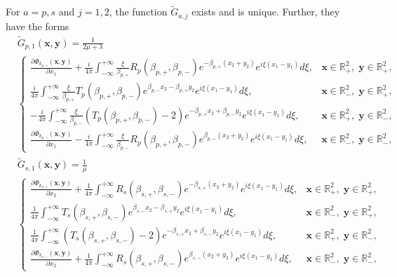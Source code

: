 \documentclass[final,reqno]{siamltex}
\newcommand{\pa}{\partial}
\newcommand{\wid}{\widetilde}
\newcommand{\mat}{\mathbb}
\newcommand{\R}{{\mat R}}
\begin{document}
\begin{theorem}\label{thm3.1}
	For $a=p,s$ and $j=1,2$, the function $\wid G_{a,j}$ exists and is unique. Further, they have the forms 
	\begin{align*}
	  &\wid G_{p,1}(\mathbf{x},\mathbf{y})=\frac{1}{2\mu+\lambda} \\
	  &\left\{
	  \begin{array}{ll}
	  	\displaystyle\frac{\pa\Phi_{k_{p,+}}(\mathbf{x},\mathbf{y})}{\pa x_1}+\frac{i}{4\pi}\int_{-\infty}^{+\infty}\frac{\xi}{\beta_{p,+}}R_p(\beta_{p,+},\beta_{p,-})e^{-\beta_{p,+}(x_2+y_2)}e^{i\xi(x_1-y_1)}d\xi,&\mathbf{x}\in\R^2_+,\;\mathbf{y}\in\R^2_+,\\
	  	\displaystyle\frac{i}{4\pi}\int_{-\infty}^{+\infty}\frac{\xi}{\beta_{p,+}}T_p(\beta_{p,+},\beta_{p,-})e^{\beta_{p,-}x_2-\beta_{p,+}y_2}e^{i\xi(x_1-y_1)}d\xi,&\mathbf{x}\in\R^2_-,\;\mathbf{y}\in\R^2_+, \\
	  	\displaystyle-\frac{i}{4\pi}\int_{-\infty}^{+\infty}\frac{\xi}{\beta_{p,-}}(T_p(\beta_{p,+},\beta_{p,-})-2)e^{-\beta_{p,+}x_2+\beta_{p,-}y_2}e^{i\xi(x_1-y_1)}d\xi,&\mathbf{x}\in\R^2_+,\;\mathbf{y}\in\R^2_-, \\
	  	\displaystyle\frac{\pa\Phi_{k_{p,-}}(\mathbf{x},\mathbf{y})}{\pa x_1}-\frac{i}{4\pi}\int_{-\infty}^{+\infty}\frac{\xi}{\beta_{p,-}}R_p(\beta_{p,+},\beta_{p,-})e^{\beta_{p,-}(x_2+y_2)}e^{i\xi(x_1-y_1)}d\xi,&\mathbf{x}\in\R^2_-,\;\mathbf{y}\in\R^2_-, 
	  \end{array}
	  \right.
	\end{align*}
	\begin{align*}
	&\wid G_{s,1}(\mathbf{x},\mathbf{y})=\frac{1}{\mu} \\
	&\left\{
	\begin{array}{ll}
		\displaystyle\frac{\pa\Phi_{k_{s,+}}(\mathbf{x},\mathbf{y})}{\pa x_2}+\frac{1}{4\pi}\int_{-\infty}^{+\infty}R_s(\beta_{s,+},\beta_{s,-})e^{-\beta_{s,+}(x_2+y_2)}e^{i\xi(x_1-y_1)}d\xi,&\mathbf{x}\in\R^2_+,\;\mathbf{y}\in\R^2_+,\\
		\displaystyle\frac{1}{4\pi}\int_{-\infty}^{+\infty}T_s(\beta_{s,+},\beta_{s,-})e^{\beta_{s,-}x_2-\beta_{s,+}y_2}e^{i\xi(x_1-y_1)}d\xi,&\mathbf{x}\in\R^2_-,\;\mathbf{y}\in\R^2_+, \\
		\displaystyle\frac{1}{4\pi}\int_{-\infty}^{+\infty}(T_s(\beta_{s,+},\beta_{s,-})-2)e^{-\beta_{s,+}x_2+\beta_{s,-}y_2}e^{i\xi(x_1-y_1)}d\xi,&\mathbf{x}\in\R^2_+,\;\mathbf{y}\in\R^2_-, \\
		\displaystyle\frac{\pa\Phi_{k_{s,-}}(\mathbf{x},\mathbf{y})}{\pa x_2}+\frac{1}{4\pi}\int_{-\infty}^{+\infty}R_s(\beta_{s,+},\beta_{s,-})e^{\beta_{s,-}(x_2+y_2)}e^{i\xi(x_1-y_1)}d\xi,&\mathbf{x}\in\R^2_-,\;\mathbf{y}\in\R^2_-,

\end{array}
\end{align*}
\end{theorem}
\end{document}
